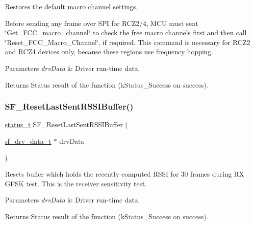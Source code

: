 Restores the default macro channel settings. 

Before sending any frame over S\+PI for R\+C\+Z2/4, M\+CU must sent \char`\"{}\+Get\+\_\+\+F\+C\+C\+\_\+macro\+\_\+channel\char`\"{} to check the free macro channels first and then call \char`\"{}\+Reset\+\_\+\+F\+C\+C\+\_\+\+Macro\+\_\+\+Channel\char`\"{}, if required. This command is necessary for R\+C\+Z2 and R\+C\+Z4 devices only, because these regions use frequency hopping.


\begin{DoxyParams}{Parameters}
{\em drv\+Data} & Driver run-\/time data.\\
\hline
\end{DoxyParams}
\begin{DoxyReturn}{Returns}
Status result of the function (k\+Status\+\_\+\+Success on success). 
\end{DoxyReturn}
\mbox{\label{group__sf__functions__group_ga9d1a55dfe0f253669bc615cff200d609}} 
\subsubsection{\texorpdfstring{SF\_ResetLastSentRSSIBuffer()}{SF\_ResetLastSentRSSIBuffer()}}
{\footnotesize\ttfamily \mbox{\hyperlink{group__ksdk__common_gaaabdaf7ee58ca7269bd4bf24efcde092}{status\+\_\+t}} S\+F\+\_\+\+Reset\+Last\+Sent\+R\+S\+S\+I\+Buffer (\begin{DoxyParamCaption}\item[{\mbox{\hyperlink{structsf__drv__data__t}{sf\+\_\+drv\+\_\+data\+\_\+t}} $\ast$}]{drv\+Data }\end{DoxyParamCaption})}



Resets buffer which holds the recently computed R\+S\+SI for 30 frames during RX G\+F\+SK test. This is the receiver sensitivity test. 


\begin{DoxyParams}{Parameters}
{\em drv\+Data} & Driver run-\/time data.\\
\hline
\end{DoxyParams}
\begin{DoxyReturn}{Returns}
Status result of the function (k\+Status\+\_\+\+Success on success). 
\end{DoxyReturn}
\mbox{\label{group__sf__functions__group_ga2aab15da7a9994b53fe66dfe5c8f85a5}} 
